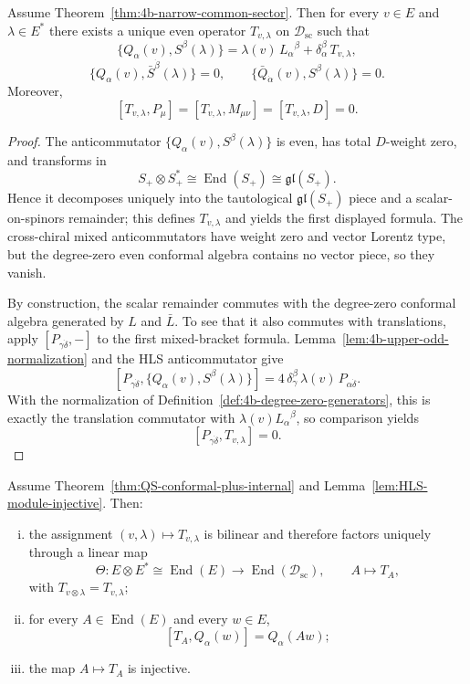 \begin{theorem}
\label{thm:QS-conformal-plus-internal}
\label{thm:QS-unbarred-first}
\label{lem:QS-conformal-plus-internal}
Assume Theorem~\ref{thm:4b-narrow-common-sector}. Then for every \(v\in E\) and
\(\lambda\in E^*\) there exists a unique even operator \(T_{v,\lambda}\) on
\(\mathcal D_{\mathrm{sc}}\) such that
\[
\{Q_\alpha(v),S^\beta(\lambda)\}
=
\lambda(v)\,L_\alpha{}^\beta+\delta_\alpha^\beta\,T_{v,\lambda},
\]
\[
\{Q_\alpha(v),\bar S^{\dot\beta}(\lambda)\}=0,
\qquad
\{\bar Q_{\dot\alpha}(v),S^\beta(\lambda)\}=0.
\]
Moreover,
\[
  [T_{v,\lambda},P_\mu]
  =
  [T_{v,\lambda},M_{\mu\nu}]
  =
  [T_{v,\lambda},D]
  =0.
\]
\end{theorem}

\begin{proof}
The anticommutator \(\{Q_\alpha(v),S^\beta(\lambda)\}\) is even, has total
\(D\)-weight zero, and transforms in
\[
  S_+\otimes S_+^*
  \cong
  \operatorname{End}(S_+)
  \cong
  \mathfrak{gl}(S_+).
\]
Hence it decomposes uniquely into the tautological \(\mathfrak{gl}(S_+)\) piece
and a scalar-on-spinors remainder; this defines \(T_{v,\lambda}\) and yields the
first displayed formula. The cross-chiral mixed anticommutators have weight zero
and vector Lorentz type, but the degree-zero even conformal algebra contains no
vector piece, so they vanish.

By construction, the scalar remainder commutes with the degree-zero conformal
algebra generated by \(L\) and \(\bar L\). To see that it also commutes with
translations, apply \([P_{\gamma\dot\delta},-]\) to the first mixed-bracket
formula. Lemma~\ref{lem:4b-upper-odd-normalization} and the HLS anticommutator
give
\[
  [P_{\gamma\dot\delta},\{Q_\alpha(v),S^\beta(\lambda)\}]
  =
  4\,\delta_\gamma^\beta\,\lambda(v)\,P_{\alpha\dot\delta}.
\]
With the normalization of Definition~\ref{def:4b-degree-zero-generators}, this is
exactly the translation commutator with
\(\lambda(v)L_\alpha{}^\beta\), so comparison yields
\[
  [P_{\gamma\dot\delta},T_{v,\lambda}]=0.
\]
\end{proof}

\smallskip

\begin{theorem}
\label{thm:internal-action-from-mixed-brackets}
Assume Theorem~\ref{thm:QS-conformal-plus-internal} and
Lemma~\ref{lem:HLS-module-injective}. Then:
\begin{enumerate}[(i)]
  \item the assignment \((v,\lambda)\mapsto T_{v,\lambda}\) is bilinear and
        therefore factors uniquely through a linear map
\[
  \Theta:E\otimes E^*\cong\operatorname{End}(E)\longrightarrow
  \operatorname{End}(\mathcal D_{\mathrm{sc}}),
  \qquad
  A\longmapsto T_A,
\]
        with \(T_{v\otimes\lambda}=T_{v,\lambda}\);
  \item for every \(A\in\operatorname{End}(E)\) and every \(w\in E\),
\[
  [T_A,Q_\alpha(w)]
  =
  Q_\alpha(Aw);
\]
  \item the map \(A\mapsto T_A\) is injective.
\end{enumerate}
\end{theorem}

